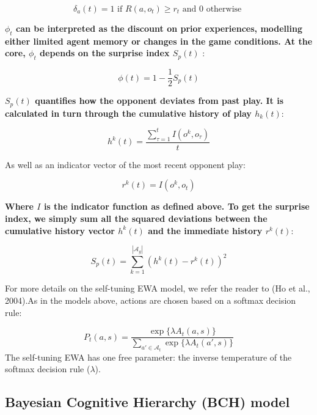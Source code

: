 \documentclass[english,man,floatsintext]{apa6}
\begin{document}
\[ \delta_{a}(t)  = 1  \text{  if  }  R(a,o_{t}) \geq r_{t}  \text{  and }  0 \text{  otherwise } \]

\textbf{\(\phi_{t}\) can be interpreted as the discount on prior experiences, modelling either limited agent memory or changes in the game conditions. At the core, \(\phi_{t}\) depends on the surprise index \(S_{p}(t)\) }:

\[ \phi(t) = 1 - \frac{1}{2}S_{p}(t) \]

\textbf{\(S_{p}(t)\) quantifies how the opponent deviates from past play. It is calculated in turn through the cumulative history of play \(h_{k}(t)\)}:

\[  h^{k}(t)= \frac{\sum_{\tau =1}^t I(o^k,o_{\tau})}{t} \]

As well as an indicator vector of the most recent opponent play:

\[r^k(t) = I(o^k,o_{t})\]

\textbf{Where \(I\) is the indicator function as defined above. To get the surprise index, we simply sum all the squared deviations between the cumulative history vector \(h^{k}(t)\) and the immediate history \(r^k(t)\)}:

\[S_{p}(t) = \sum_{k=1}^{|\mathcal{A}_g|} (h^{k}(t) - r^k(t))^2 \]

For more details on the self-tuning EWA model, we refer the reader to (Ho et al., 2004).As in the models above, actions are chosen based on a softmax decision rule:

\[P_t(a,s) = \frac{\exp \{\lambda  A_{t}(a,s) \} }{\sum_{a' \in \mathcal{A}_t} \exp \{ \lambda A_{t}(a',s) \} } \]
The self-tuning EWA has one free parameter: the inverse temperature of the softmax decision rule (\(\lambda\)).

\subsection{Bayesian Cognitive Hierarchy (BCH) model}
\end{document}
